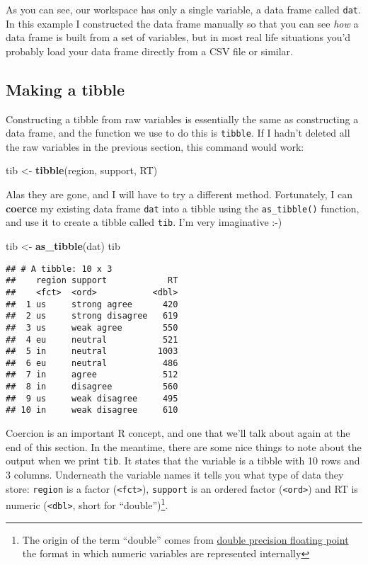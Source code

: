 \documentclass[]{book}
\newenvironment{Shaded}{\begin{snugshade}}{\end{snugshade}}
\newcommand{\KeywordTok}[1]{\textcolor[rgb]{0.13,0.29,0.53}{\textbf{#1}}}
\newcommand{\NormalTok}[1]{#1}
\newcommand{\StringTok}[1]{\textcolor[rgb]{0.31,0.60,0.02}{#1}}
\let\rmarkdownfootnote\footnote%
\def\footnote{\protect\rmarkdownfootnote}
\begin{document}
As you can see, our workspace has only a single variable, a data frame called \texttt{dat}. In this example I constructed the data frame manually so that you can see \emph{how} a data frame is built from a set of variables, but in most real life situations you'd probably load your data frame directly from a CSV file or similar.

\hypertarget{making-a-tibble}{%
\subsection{Making a tibble}\label{making-a-tibble}}

Constructing a tibble from raw variables is essentially the same as constructing a data frame, and the function we use to do this is \texttt{tibble}. If I hadn't deleted all the raw variables in the previous section, this command would work:

\begin{Shaded}
\begin{Highlighting}[]
\NormalTok{tib <-}\StringTok{ }\KeywordTok{tibble}\NormalTok{(region, support, RT)}
\end{Highlighting}
\end{Shaded}

Alas they are gone, and I will have to try a different method. Fortunately, I can \textbf{coerce} my existing data frame \texttt{dat} into a tibble using the \texttt{as\_tibble()} function, and use it to create a tibble called \texttt{tib}. I'm very imaginative :-)

\begin{Shaded}
\begin{Highlighting}[]
\NormalTok{tib <-}\StringTok{ }\KeywordTok{as_tibble}\NormalTok{(dat)}
\NormalTok{tib}
\end{Highlighting}
\end{Shaded}

\begin{verbatim}
## # A tibble: 10 x 3
##    region support            RT
##    <fct>  <ord>           <dbl>
##  1 us     strong agree      420
##  2 us     strong disagree   619
##  3 us     weak agree        550
##  4 eu     neutral           521
##  5 in     neutral          1003
##  6 eu     neutral           486
##  7 in     agree             512
##  8 in     disagree          560
##  9 us     weak disagree     495
## 10 in     weak disagree     610
\end{verbatim}

Coercion is an important R concept, and one that we'll talk about again at the end of this section. In the meantime, there are some nice things to note about the output when we print \texttt{tib}. It states that the variable is a tibble with 10 rows and 3 columns. Underneath the variable names it tells you what type of data they store: \texttt{region} is a factor (\texttt{\textless{}fct\textgreater{}}), \texttt{support} is an ordered factor (\texttt{\textless{}ord\textgreater{}}) and RT is numeric (\texttt{\textless{}dbl\textgreater{}}, short for ``double'')\footnote{The origin of the term ``double'' comes from \href{https://en.wikipedia.org/wiki/Double-precision_floating-point_format}{double precision floating point} the format in which numeric variables are represented internally}.
\end{document}
